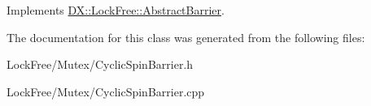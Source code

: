 Implements \hyperlink{class_d_x_1_1_lock_free_1_1_abstract_barrier_a9040adf7507467e5a653bdaf2fbd17a6}{D\-X\-::\-Lock\-Free\-::\-Abstract\-Barrier}.



The documentation for this class was generated from the following files\-:\begin{DoxyCompactItemize}
\item 
Lock\-Free/\-Mutex/Cyclic\-Spin\-Barrier.\-h\item 
Lock\-Free/\-Mutex/Cyclic\-Spin\-Barrier.\-cpp\end{DoxyCompactItemize}
